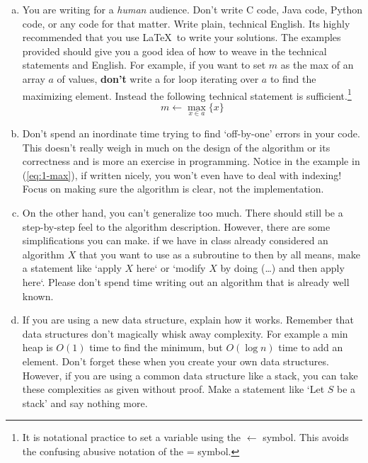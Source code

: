 \documentclass[11pt]{article}
\theoremstyle{plain}
\theoremstyle{definition}
\numberwithin{equation}{section}
\numberwithin{figure}{section}
\begin{document}
\begin{enumerate}[(a)]
\item You are writing for a \emph{human} audience. Don't write C code, Java code, Python code, or any code for that matter. Write plain, technical English. Its highly recommended that you use \LaTeX \ to write your solutions. The examples provided should give you a good idea of how to weave in the technical statements and English. For example, if you want to set $m$ as the max of an array $a$ of values, \textbf{don't} write a for loop iterating over $a$ to find the maximizing element. Instead the following technical statement is sufficient.\footnote{It is notational practice to set a variable using the $\leftarrow$ symbol. This avoids the confusing abusive notation of the = symbol.}
\begin{equation}
m \leftarrow \max_{x \in a} \{ x \}
\label{eq:1-max}
\end{equation}

\item Don't spend an inordinate time trying to find `off-by-one' errors in your code. This doesn't really weigh in much on the design of the algorithm or its correctness and is more an exercise in programming. Notice in the example in (\ref{eq:1-max}), if written nicely, you won't even have to deal with indexing! Focus on making sure the algorithm is clear, not the implementation.

\item On the other hand, you can't generalize too much. There should still be a step-by-step feel to the algorithm description. However, there are some simplifications you can make. if we have in class already considered an algorithm $X$ that you want to use as a subroutine to then by all means, make a statement like `apply $X$ here` or `modify $X$ by doing (\ldots) and then apply here`. Please don't spend time writing out an algorithm that is already well known.

\item If you are using a new data structure, explain how it works. Remember that data structures don't magically whisk away complexity. For example a min heap is $O(1)$ time to find the minimum, but $O(\log n)$ time to add an element. Don't forget these when you create your own data structures. However, if you are using a common data structure like a stack, you can take these complexities as given without proof. Make a statement like `Let $S$ be a stack' and say nothing more.
\end{enumerate}
\end{document}

